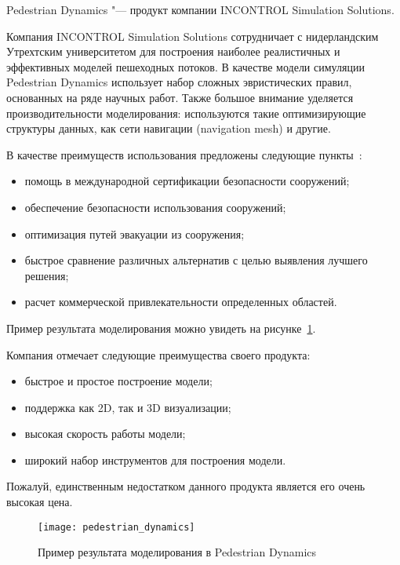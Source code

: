 \newcommand{\iss}{IN\-CON\-TROL Si\-mu\-la\-ti\-on So\-lu\-ti\-ons}

Pedestrian Dynamics "--- продукт компании \iss{}.

Компания \iss{} сотрудничает с нидерландским Утрехтским университетом для построения наиболее реалистичных и эффективных моделей пешеходных потоков.
В качестве модели симуляции Pedestrian Dynamics использует набор сложных эвристических правил, основанных на ряде научных работ.
Также большое внимание уделяется производительности моделирования: используются такие оптимизирующие структуры данных, как сети навигации (navigation mesh) и другие.

В качестве преимуществ использования предложены следующие пункты~\cite{pedestrian_dynamics}:
\begin{itemize}
  \item помощь в международной сертификации безопасности сооружений;
  \item обеспечение безопасности использования сооружений;
  \item оптимизация путей эвакуации из сооружения;
  \item быстрое сравнение различных альтернатив с целью выявления лучшего решения;
  \item расчет коммерческой привлекательности определенных областей.
\end{itemize}

Пример результата моделирования можно увидеть на рисунке~\ref{sub:domain:analogs:pd:image_example}.

Компания отмечает следующие преимущества своего продукта:
\begin{itemize}
  \item быстрое и простое построение модели;
  \item поддержка как 2D, так и 3D визуализации;
  \item высокая скорость работы модели;
  \item широкий набор инструментов для построения модели.
\end{itemize}

Пожалуй, единственным недостатком данного продукта является его очень высокая цена.

\begin{figure}[ht!]
  \texttt{[image: pedestrian\_dynamics]}
  \caption{Пример результата моделирования в Pedestrian Dynamics}
  \label{sub:domain:analogs:pd:image_example}
\end{figure}

